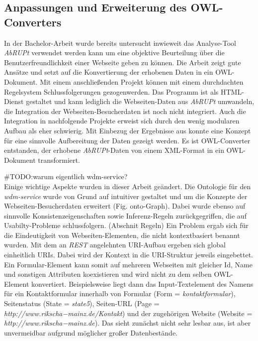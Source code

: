 \documentclass[runningheads,a4paper]{llncs}
\begin{document}
\subsection{Anpassungen und Erweiterung des OWL-Converters}

In der Bachelor-Arbeit \cite{Brieger} wurde bereits untersucht inwieweit das Analyse-Tool \textit{AbRUPt} \cite{url_abrupt} verwendet werden kann um eine objektive Beurteilung über die Benutzerfreundlichkeit einer Webseite geben zu können. 
Die Arbeit zeigt gute Ansätze und setzt auf die Konvertierung der erhobenen Daten in ein OWL-Dokument. 
Mit einem anschließenden Projekt können mit einem durchdachten Regelsystem Schlussfolgerungen gezogenwerden. 
Das Programm ist als HTML-Dienst gestaltet und kann lediglich die Webseiten-Daten aus \textit{AbRUPt} umwandeln, die Integration der Webseiten-Besucherdaten ist noch nicht integriert. 
Auch die Integration in nachfolgende Projekte erweist sich durch den wenig modularen Aufbau als eher schwierig. 
Mit Einbezug der Ergebnisse aus \cite{Martin} konnte eine Konzept für eine sinnvolle Aufbereitung der Daten gezeigt werden. 
Es ist OWL-Converter entstanden, der erhobene \textit{AbRUPt}-Daten von einem XML-Format in ein OWL-Dokument transformiert.

\#TODO:warum eigentlich wdm-service?
\\

Einige wichtige Aspekte wurden in dieser Arbeit geändert. 
Die Ontologie für den \textit{wdm-service} wurde von Grund auf intuitiver gestaltet und um die Konzepte der Webseiten-Besucherdaten erweitert (Fig. onto-Graph). 
Dabei wurde ebenso auf sinnvolle Konsistenzeigenschaften sowie Inferenz-Regeln zurückgegriffen, die auf Usabilty-Probleme schlussfolgern. (Abschnit Regeln)
Ein Problem ergab sich für die Eindeutigkeit von Webseiten-Elementen, die nicht kontextbasiert benannt wurden. 
Mit dem an \textit{REST} angelehnten URI-Aufbau ergeben sich global einheitlich URIs.
Dabei wird der Kontext in die URI-Struktur jeweils eingebettet. 
Ein Formular-Element kann somit auf mehreren Webseiten mit gleicher Id, Name und sonstigen Attributen koexistieren und wird nicht zu dem selben OWL-Element konvertiert. 
Beispielsweise liegt dann das Input-Textelement des Namens für ein Kontaktformular innerhalb von Formular (Form = \textit{kontaktformular}), Seitenstatus (State = \textit{state5}), Seiten-URL (Page = \textit{http://www.rikscha−mainz.de/Kontakt}) und der zugehörigen Website (Website = \textit{http://www.rikscha−mainz.de}).
Das sieht zunächst nicht sehr lesbar aus, ist aber unvermeidbar aufgrund möglicher großer Datenbestände. 

 
\end{document}
